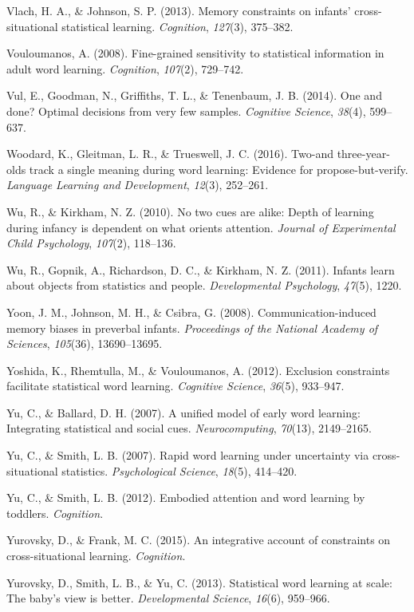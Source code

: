 \documentclass[authoryear, review]{elsarticle}
\begin{document}
\hypertarget{ref-vlach2013memory}{}
Vlach, H. A., \& Johnson, S. P. (2013). Memory constraints on infants'
cross-situational statistical learning. \emph{Cognition}, \emph{127}(3),
375--382.

\hypertarget{ref-vouloumanos2008fine}{}
Vouloumanos, A. (2008). Fine-grained sensitivity to statistical
information in adult word learning. \emph{Cognition}, \emph{107}(2),
729--742.

\hypertarget{ref-vul2014}{}
Vul, E., Goodman, N., Griffiths, T. L., \& Tenenbaum, J. B. (2014). One
and done? Optimal decisions from very few samples. \emph{Cognitive
Science}, \emph{38}(4), 599--637.

\hypertarget{ref-woodard2016two}{}
Woodard, K., Gleitman, L. R., \& Trueswell, J. C. (2016). Two-and
three-year-olds track a single meaning during word learning: Evidence
for propose-but-verify. \emph{Language Learning and Development},
\emph{12}(3), 252--261.

\hypertarget{ref-wu2010no}{}
Wu, R., \& Kirkham, N. Z. (2010). No two cues are alike: Depth of
learning during infancy is dependent on what orients attention.
\emph{Journal of Experimental Child Psychology}, \emph{107}(2),
118--136.

\hypertarget{ref-wu2011infants}{}
Wu, R., Gopnik, A., Richardson, D. C., \& Kirkham, N. Z. (2011). Infants
learn about objects from statistics and people. \emph{Developmental
Psychology}, \emph{47}(5), 1220.

\hypertarget{ref-yoon2008communication}{}
Yoon, J. M., Johnson, M. H., \& Csibra, G. (2008). Communication-induced
memory biases in preverbal infants. \emph{Proceedings of the National
Academy of Sciences}, \emph{105}(36), 13690--13695.

\hypertarget{ref-yoshida2012exclusion}{}
Yoshida, K., Rhemtulla, M., \& Vouloumanos, A. (2012). Exclusion
constraints facilitate statistical word learning. \emph{Cognitive
Science}, \emph{36}(5), 933--947.

\hypertarget{ref-yu2007unified}{}
Yu, C., \& Ballard, D. H. (2007). A unified model of early word
learning: Integrating statistical and social cues.
\emph{Neurocomputing}, \emph{70}(13), 2149--2165.

\hypertarget{ref-yu2007rapid}{}
Yu, C., \& Smith, L. B. (2007). Rapid word learning under uncertainty
via cross-situational statistics. \emph{Psychological Science},
\emph{18}(5), 414--420.

\hypertarget{ref-yu2012embodied}{}
Yu, C., \& Smith, L. B. (2012). Embodied attention and word learning by
toddlers. \emph{Cognition}.

\hypertarget{ref-yurovsky2014algorithmic}{}
Yurovsky, D., \& Frank, M. C. (2015). An integrative account of
constraints on cross-situational learning. \emph{Cognition}.

\hypertarget{ref-yurovsky2013statistical}{}
Yurovsky, D., Smith, L. B., \& Yu, C. (2013). Statistical word learning
at scale: The baby's view is better. \emph{Developmental Science},
\emph{16}(6), 959--966.


\end{document}
